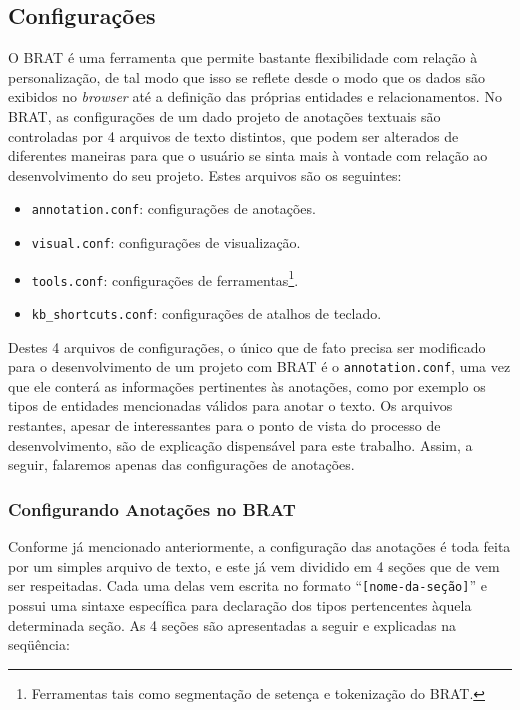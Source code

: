 \documentclass[11pt]{report}
\newcommand{\quotes}[1]{``#1''}
\begin{document}
\subsection{Configurações}

\indent\indent O BRAT é uma ferramenta que permite bastante flexibilidade com relação à personalização, de tal modo que isso se reflete desde
o modo que os dados são exibidos no \textit{browser} até a definição das próprias entidades e relacionamentos. No BRAT, as configurações de um dado projeto de anotações
textuais são controladas por 4 arquivos de texto distintos, que podem ser alterados de diferentes maneiras para que o usuário se sinta mais à vontade com relação ao desenvolvimento do
seu projeto. Estes arquivos são os seguintes:

\begin{itemize}
  \item \texttt{annotation.conf}: configurações de anotações.
  \item \texttt{visual.conf}: configurações de visualização.
  \item \texttt{tools.conf}: configurações de ferramentas\footnote[5]{Ferramentas tais como segmentação de setença e tokenização do BRAT.}.
  \item \texttt{kb\_shortcuts.conf}: configurações de atalhos de teclado.
\end{itemize}

Destes 4 arquivos de configurações, o único que de fato precisa ser modificado para o desenvolvimento de um projeto com BRAT é o \texttt{annotation.conf}, uma vez que ele
conterá as informações pertinentes às anotações, como por exemplo os tipos de entidades mencionadas válidos para anotar o texto. Os arquivos restantes, apesar de interessantes
para o ponto de vista do processo de desenvolvimento, são de explicação dispensável para este trabalho. Assim, a seguir, falaremos apenas das configurações de anotações.

\subsubsection{Configurando Anotações no BRAT}

\indent\indent Conforme já mencionado anteriormente, a configuração das anotações é toda feita por um simples arquivo de texto, e este já vem dividido em 4 seções que de vem ser
respeitadas. Cada uma delas vem escrita no formato \quotes{\texttt{[nome-da-seção]}} e possui uma sintaxe específica para declaração dos tipos pertencentes àquela
determinada seção. As 4 seções são apresentadas a seguir e explicadas na seqüência:
\end{document}
